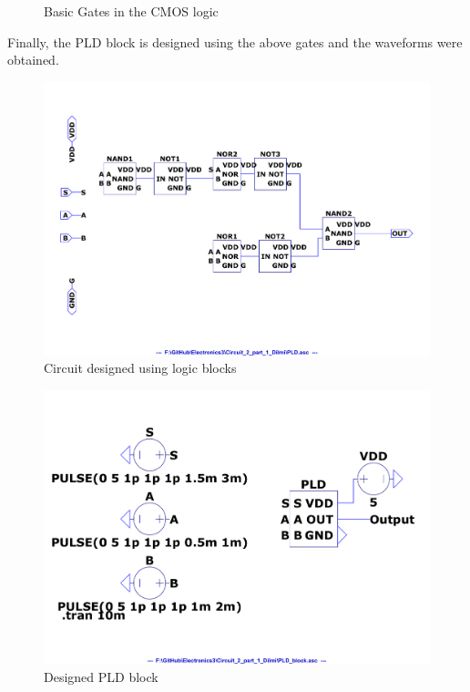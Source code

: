 \documentclass[a4paper,11pt]{article}%
\begin{document}
\begin{figure}[H]
{	}
\caption{Basic Gates in the CMOS logic}
\end{figure}
%
%
Finally, the PLD block is designed using the above gates and the waveforms were obtained.

\begin{figure}[H]
	\centering
	\includegraphics[scale=0.55]{figures/2part1/cct.pdf}
	\caption{Circuit designed using logic blocks}
\end{figure}

\begin{figure}[H]
	\centering
	\includegraphics[scale=0.5]{figures/2part1/block.pdf}
	\caption{Designed PLD block}
\end{figure}
\end{document}
